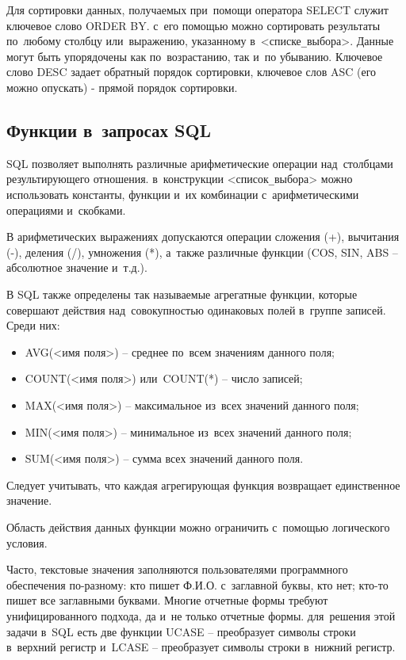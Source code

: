 \documentclass{ou}
\begin{document}
Для сортировки данных, получаемых при~помощи оператора SELECT служит ключевое слово ORDER BY. с~его помощью можно сортировать результаты по~любому столбцу или~выражению, указанному в~<списке\verb|_|выбора>. Данные могут быть упорядочены как по~возрастанию, так и~по убыванию. Ключевое слово DESC задает обратный порядок сортировки, ключевое слов ASC (его можно опускать) - прямой порядок сортировки.  
\subsection{Функции в~запросах SQL}
SQL позволяет выполнять различные арифметические операции над~столбцами результирующего отношения. в~конструкции <список\verb|_|выбора> можно использовать константы, функции и~их комбинации с~арифметическими операциями и~скобками. 

В арифметических выражениях допускаются операции сложения (+), вычитания (-), деления (/), умножения (*), а~также различные функции (COS, SIN, ABS -- абсолютное значение и~т.д.). 
 
В SQL также определены так называемые агрегатные функции, которые совершают действия над~совокупностью одинаковых полей в~группе записей. Среди них: 
\begin{itemize}[label=-, itemindent=4em, nosep]
\item AVG(<имя поля>) -- среднее по~всем значениям данного поля;
\item COUNT(<имя поля>) или~COUNT(*) -- число записей;
\item MAX(<имя поля>) -- максимальное из~всех значений данного поля;
\item MIN(<имя поля>) -- минимальное из~всех значений данного поля;
\item SUM(<имя поля>) -- сумма всех значений данного поля.
\end{itemize}

Следует учитывать, что каждая агрегирующая функция возвращает единственное значение. 

Область действия данных функции можно ограничить с~помощью логического условия. 

Часто, текстовые значения заполняются пользователями программного обеспечения по-разному: кто пишет Ф.И.О. с~заглавной буквы, кто нет; кто-то пишет все заглавными буквами. Многие отчетные формы требуют унифицированного подхода, да и~не только отчетные формы. для~решения этой задачи в~SQL есть две функции UCASE -- преобразует символы строки в~верхний регистр и~LCASE -- преобразует символы строки в~нижний регистр. 
\end{document}
